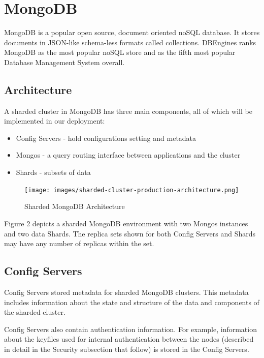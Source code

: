\documentclass[9pt,twocolumn,twoside]{../../styles/osajnl}
\begin{document}
\section{MongoDB}

MongoDB is a popular open source, document oriented noSQL database.  It stores documents in JSON-like schema-less formats called collections. \cite{www-MonWiki}  DBEngines ranks MongoDB as the most popular noSQL store and as the fifth most popular Database Management System overall. \cite{www-dbEngines}

\subsection{Architecture}

A sharded cluster in MongoDB has three main components, all of which will be implemented in our deployment:

\begin{itemize}
\item Config Servers - hold configurations setting and metadata
\item Mongos - a query routing interface between applications and the cluster
\item Shards - subsets of data
\end{itemize}

\begin{figure}[ht]
  \texttt{[image: images/sharded-cluster-production-architecture.png]}
  \caption{Sharded MongoDB Architecture} \cite{www-mongoComponents}
\end{figure}

Figure 2 depicts a sharded MongoDB environment with two Mongos instances and two data Shards.  The replica sets shown for both Config Servers and Shards may have any number of replicas within the set.

\subsection{Config Servers}

Config Servers stored metadata for sharded MongoDB clusters.  This metadata includes information about the state and structure of the data and components of the sharded cluster. \cite{www-mongoConfig}

Config Servers also contain authentication information.  For example, information about the keyfiles used for internal authentication between the nodes (described in detail in the Security subsection that follow) is stored in the Config Servers. \cite{www-mongoConfig}
\end{document}
